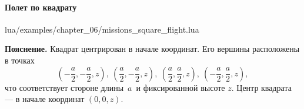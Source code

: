 \paragraph{Полет по квадрату}
\begin{codefile}{lua/examples/chapter_06/missions_square_flight.lua}
\end{codefile}
\textbf{Пояснение.} Квадрат центрирован в начале координат. Его вершины расположены в точках
\[
  \left(-\frac{a}{2}, -\frac{a}{2}, z\right),\ \left(\frac{a}{2}, -\frac{a}{2}, z\right),\ \left(\frac{a}{2}, \frac{a}{2}, z\right),\ \left(-\frac{a}{2}, \frac{a}{2}, z\right),
\]
что соответствует стороне длины \(\,a\,\) и фиксированной высоте \(z\). Центр квадрата — в начале координат \((0,0,z)\).
